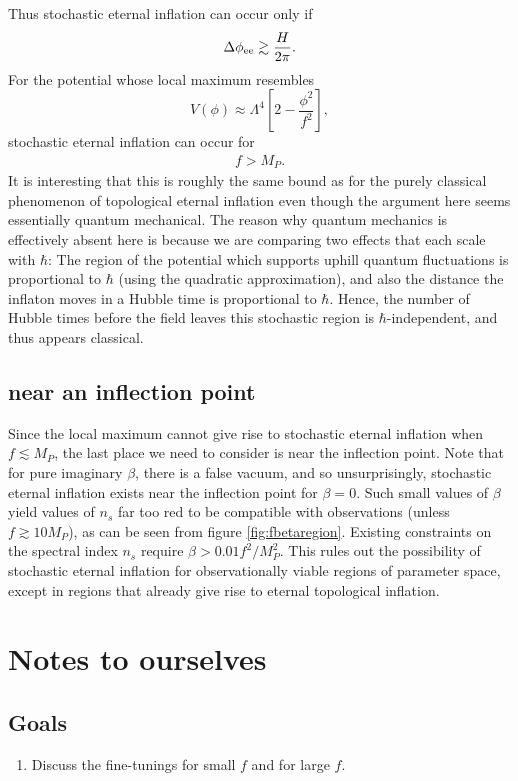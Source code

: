 \documentclass[aps,amsfonts,amsmath,prd,preprint,nofootinbib]{revtex4}
\newcommand{\Mp}{{M_{P}}}
\newcommand{\MMp}{{M_P^2}}
\newcommand{\beq}{\begin{equation}}
\newcommand{\eeq}{\end{equation}}
\begin{document}
\begin{appendix}
Thus stochastic eternal inflation can occur only if
\begin{align}
\Delta\phi_{\rm ee} \gtrsim \frac{H}{2\pi}.
\end{align}
For the potential whose local maximum resembles
\beq
V(\phi) \approx \Lambda^4\left[2 - \frac{\phi^2}{f^2}\right], \label{eq:Vp2}
\eeq
stochastic eternal inflation can occur for
\begin{align}
f > \Mp.
\end{align}
It is interesting that this is roughly the same bound as for the purely classical phenomenon of topological eternal inflation even though the argument here seems essentially quantum mechanical.  The reason
why quantum mechanics is effectively absent here is because we are comparing two effects that each scale with $\hbar$:  The region of the potential which supports uphill quantum fluctuations is proportional to $\hbar$ (using the quadratic approximation), and also the distance the inflaton moves in a Hubble time is proportional to $\hbar$.  Hence, the number of Hubble times before the field leaves this stochastic region is $\hbar$-independent, and thus appears classical.


\subsection{near an inflection point}
Since the local maximum cannot give rise to stochastic eternal inflation when $f \lesssim \Mp$, the last place we need to consider is near the inflection point. 
Note that for pure imaginary $\beta$, there is a false vacuum, and so unsurprisingly, stochastic eternal inflation exists near the inflection point for $\beta = 0$.  Such small
values of $\beta$ yield values of $n_s$ far too red to be compatible with observations (unless $f \gtrsim 10 \Mp$), as can be seen from figure \ref{fig:fbetaregion}. 
Existing constraints on the spectral index $n_s$ require $\beta > 0.01 f^2/\MMp$.  This rules out the possibility of stochastic eternal inflation for observationally viable regions of
parameter space, except in regions that already give rise to eternal topological inflation.



\section{Notes to ourselves}
\subsection{Goals}
\begin{enumerate}
\item Discuss the fine-tunings for small $f$ and for large $f$.  


\end{enumerate}
\end{appendix}
\end{document}
